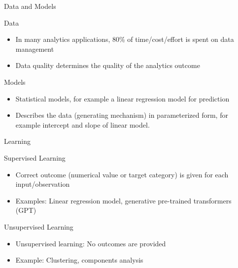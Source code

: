\documentclass[ignorenonframetext,xcolor=dvipsnames]{beamer}
\begin{document}
\begin{frame}{Data and Models}
\begin{block}{Data}
\begin{itemize}
	\item In many analytics applications, 80\% of time/cost/effort is spent on data management
	\item Data quality determines the quality of the analytics outcome
\end{itemize}
\end{block}
\begin{block}{Models}
\begin{itemize}
	\item Statistical models, for example a linear regression model for prediction
	\item Describes the data (generating mechanism) in parameterized form, for example intercept and slope of linear model.
\end{itemize}
\end{block}
\end{frame}

\begin{frame}{Learning}
\begin{block}{Supervised Learning}
\begin{itemize}
	\item Correct outcome (numerical value or target category) is given for each input/observation
	\item Examples: Linear regression model, generative pre-trained transformers (GPT)
\end{itemize}
\end{block}
\begin{block}{Unsupervised Learning}
\begin{itemize}
	\item Unsupervised learning: No outcomes are provided
	\item Example: Clustering, components analysis
\end{itemize}
\end{block}
\end{frame}
\end{document}
